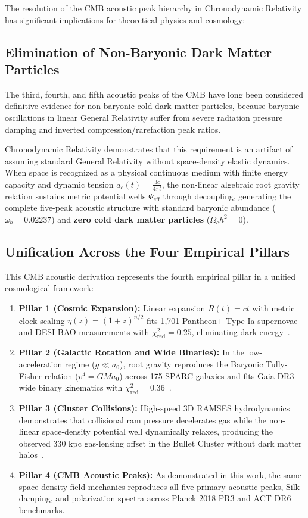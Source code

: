 \documentclass[aps,prd,reprint,superscriptaddress,nofootinbib,twocolumn]{revtex4-2}
\begin{document}
The resolution of the CMB acoustic peak hierarchy in Chronodynamic Relativity has significant implications for theoretical physics and cosmology:

\subsection{Elimination of Non-Baryonic Dark Matter Particles}

The third, fourth, and fifth acoustic peaks of the CMB have long been considered definitive evidence for non-baryonic cold dark matter particles, because baryonic oscillations in linear General Relativity suffer from severe radiation pressure damping and inverted compression/rarefaction peak ratios.

Chronodynamic Relativity demonstrates that this requirement is an artifact of assuming standard General Relativity without space-density elastic dynamics. When space is recognized as a physical continuous medium with finite energy capacity and dynamic tension $a_c(t) = \frac{3c}{4\pi t}$, the non-linear algebraic root gravity relation sustains metric potential wells $\Psi_{\text{eff}}$ through decoupling, generating the complete five-peak acoustic structure with standard baryonic abundance ($\omega_b = 0.02237$) and \textbf{zero cold dark matter particles} ($\Omega_c h^2 = 0$).

\subsection{Unification Across the Four Empirical Pillars}

This CMB acoustic derivation represents the fourth empirical pillar in a unified cosmological framework:
\begin{enumerate}
    \item \textbf{Pillar 1 (Cosmic Expansion):} Linear expansion $R(t) = ct$ with metric clock scaling $\eta(z) = (1+z)^{n/2}$ fits 1,701 Pantheon+ Type Ia supernovae and DESI BAO measurements with $\chi^2_{\text{red}} = 0.25$, eliminating dark energy~\cite{Shreve2026_Expansion}.
    \item \textbf{Pillar 2 (Galactic Rotation and Wide Binaries):} In the low-acceleration regime ($g \ll a_0$), root gravity reproduces the Baryonic Tully-Fisher relation ($v^4 = G M a_0$) across 175 SPARC galaxies and fits Gaia DR3 wide binary kinematics with $\chi^2_{\text{red}} = 0.36$~\cite{Shreve2026_WideBinaries}.
    \item \textbf{Pillar 3 (Cluster Collisions):} High-speed 3D RAMSES hydrodynamics demonstrates that collisional ram pressure decelerates gas while the non-linear space-density potential well dynamically relaxes, producing the observed 330 kpc gas-lensing offset in the Bullet Cluster without dark matter halos~\cite{Shreve2026_Clusters}.
    \item \textbf{Pillar 4 (CMB Acoustic Peaks):} As demonstrated in this work, the same space-density field mechanics reproduces all five primary acoustic peaks, Silk damping, and polarization spectra across Planck 2018 PR3 and ACT DR6 benchmarks.
\end{enumerate}
\end{document}
